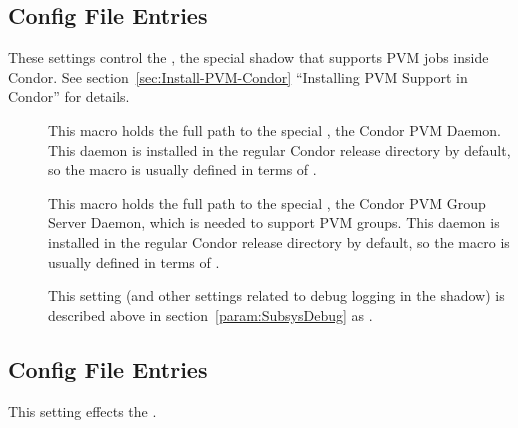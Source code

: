 \subsection{ Config File Entries}
\label{sec:Shadow-PVM-Config-File-Entries}

These settings control the , the special shadow
that supports PVM jobs inside Condor.  See
section~\ref{sec:Install-PVM-Condor} ``Installing PVM Support in
Condor'' for details.

\begin{description}

\item[] \label{param:PvmD}  This macro holds the full path
  to the special , the Condor PVM Daemon.  This daemon is
  installed in the regular Condor release directory by default, so the
  macro is usually defined in terms of .
  
\item[] \label{param:PvmGS} This macro holds the full
  path to the special , the Condor PVM Group Server
  Daemon, which is needed to support PVM groups.  This daemon is
  installed in the regular Condor release directory by default, so the
  macro is usually defined in terms of .

\item[] \label{param:ShadowDebug} This setting
  (and other settings related to debug logging in the shadow) is
  described above in section~\ref{param:SubsysDebug} as
  .

\end{description}

\subsection{ Config File Entries}
\label{sec:Starter-Config-File-Entries}

This setting effects the .

